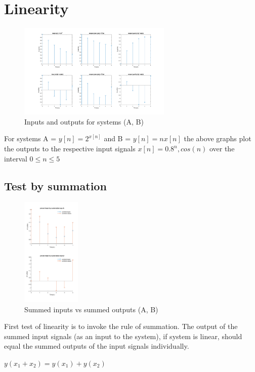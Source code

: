 \documentclass[a4paper,11pt]{article}
\begin{document}
	\section{Linearity}
		\begin{figure}[h]
		 \begin{center}
		  \includegraphics[width=0.65\textwidth]{2a}
		  \caption{Inputs and outputs for systems (A, B)}
		 \end{center}
		\end{figure}
		For systems A = $y[n] = 2^{x[n]}$ and B = $y[n] = nx[n]$ the above graphs plot the outputs to the respective input signals $x[n] = 0.8^{n}, cos(n)$ over the interval $0 \leq n \leq 5$
		\subsection{Test by summation}
			\begin{figure}[h]
			 \begin{center}
			  \includegraphics[width=0.25\textwidth]{2b}
			  \caption{Summed inputs vs summed outputs (A, B)}
			 \end{center}
			\end{figure}
			First test of linearity is to invoke the rule of summation. The output of the summed input signals (as an input to the system), if system is linear, should equal the summed outputs of the input signals individually.
			\begin{center}
			$y(x_{1}+x_{2}) = y(x_{1}) + y(x_{2})$
			\end{center}
			
\end{document}

